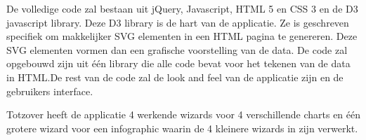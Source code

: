 De volledige code zal bestaan uit jQuery, Javascript, HTML 5 en CSS 3 en de D3 javascript library. Deze D3 library is de hart van de applicatie. Ze is geschreven specifiek om makkelijker SVG elementen in een HTML pagina te genereren. Deze SVG elementen vormen dan een grafische voorstelling van de data.
De code zal opgebouwd zijn uit \'{e}\'{e}n library die alle code bevat voor het tekenen van de data in HTML.De rest van de code zal de look and feel van de applicatie zijn en de gebruikers interface. 

Totzover heeft de applicatie 4 werkende wizards voor 4 verschillende charts en \'{e}\'{e}n grotere wizard voor een infographic waarin de 4 kleinere wizards in zijn verwerkt.


\tableofcontents


\listoffigures